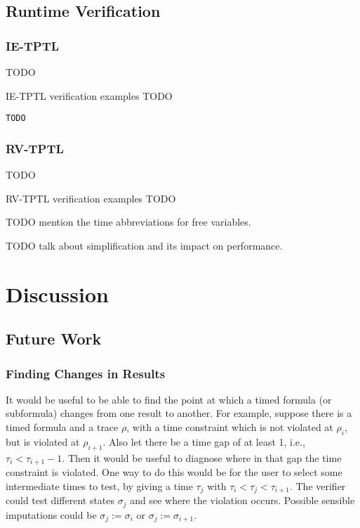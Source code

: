 \documentclass[a4paper]{article}
\begin{document}
\subsection{Runtime Verification}

\subsubsection{IE-TPTL}
TODO
\begin{eg}{IE-TPTL verification examples}
  TODO
\end{eg}

\begin{lstlisting}[caption={Finalise method for IE-TPTL}]
TODO
\end{lstlisting}
\subsubsection{RV-TPTL}
TODO
\begin{eg}{RV-TPTL verification examples}
  TODO
\end{eg}

TODO mention the time abbreviations for free variables.

TODO talk about simplification and its impact on performance.

\section{Discussion}
\subsection{Future Work}

\subsubsection{Finding Changes in Results}
It would be useful to be able to find the point at which a timed formula (or subformula) changes from one result to another. For example, suppose there is a timed formula and a trace $\rho$, with a time constraint which is not violated at $\rho_i$, but is violated at $\rho_{i+1}$. Also let there be a time gap of at least 1, i.e., $\tau_i < \tau_{i+1} - 1$. Then it would be useful to diagnose where in that gap the time constraint is violated. One way to do this would be for the user to select some intermediate times to test, by giving a time $\tau_j$ with $\tau_i < \tau_j < \tau_{i+1}$. The verifier could test different states $\sigma_j$ and see where the violation occurs. Possible sensible imputations could be $\sigma_j := \sigma_i$ or $\sigma_j := \sigma_{i+1}$.
\end{document}
